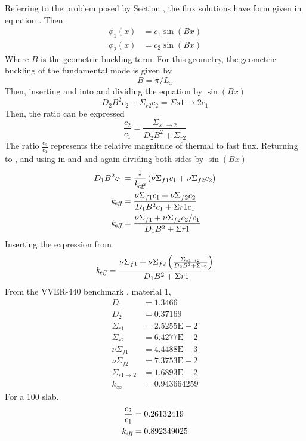   Referring to the problem posed by Section , the flux 
  solutions have form given in equation . Then
  \begin{align}
    \label{eq:twogroupflux1}
    \phi_1(x) &= c_1 \sin(Bx) \\
    \label{eq:twogroupflux2}
    \phi_2(x) &= c_2 \sin(Bx)
  \end{align}
  Where $B$ is the geometric buckling term. For this geometry, the geometric 
  buckling of the fundamental mode is given by 
  \begin{equation}
    B = \pi/L_x
  \end{equation}
  Then, inserting  and  into 
   and dividing the equation by $\sin(Bx)$
  \begin{equation}
    D_2 B^2 c_2 + \Sigma_{r2} c_2 = \Sigma{s1\rightarrow2} c_1
  \end{equation}
  Then, the ratio can be expressed
  \begin{equation} \label{eq:fluxratio}
    \frac{c_2}{c_1} = \frac{\Sigma_{s1\rightarrow2}}{D_2 B^2 + \Sigma_{r2}}
  \end{equation}
  The ratio $\frac{c_2}{c_1}$ represents the relative magnitude of thermal to 
  fast flux. Returning to , and using in 
   and  and again dividing both
  sides by  $\sin(Bx)$
  \begin{align}
    D_1 B^2 c_1 &= \frac{1}{k_{\!\mbox{\scriptsize \em eff}}} \left( \nu \Sigma_{f1} c_1 + 
      \nu \Sigma_{f2} c_2\right)\\
    k_{\!\mbox{\scriptsize \em eff}} &= \frac{\nu \Sigma_{f1} c_1 + \nu \Sigma_{f2} c_2}
      {D_1 B^2 c_1 + \Sigma{r1} c_1}\\
    k_{\!\mbox{\scriptsize \em eff}} &= \frac{\nu \Sigma_{f1} + \nu \Sigma_{f2} c_2/c_1}
      {D_1 B^2 + \Sigma{r1}}
  \end{align}
  Inserting the expression from 
  \begin{equation}
    k_{\!\mbox{\scriptsize \em eff}} = \frac{\nu \Sigma_{f1} + \nu \Sigma_{f2} 
      \left(\frac{\Sigma_{s1\rightarrow2}}{D_2B^2+\Sigma_{r2}}\right)}
      {D_1 B^2 + \Sigma{r1}}
  \end{equation}
  From the VVER-440 benchmark , material 1,
  \begin{align*}
    D_1 &= 1.3466  \\
    D_2 &= 0.37169 \\
    \Sigma_{r1} &= 2.5255\text{E}-2\\
    \Sigma_{r2} &= 6.4277\text{E}-2\\
    \nu \Sigma_{f1}  &= 4.4488\text{E}-3\\
    \nu \Sigma_{f2}  &= 7.3753\text{E}-2\\
    \Sigma_{s1\rightarrow2} &= 1.6893\text{E}-2 \\
    k_{\infty} &= 0.943664259
  \end{align*}
  For a 100  slab.
  \begin{align}
    \frac{c_2}{c_1} &= 0.26132419 \\
    k_{\!\mbox{\scriptsize \em eff}} &= 0.892349025
  \end{align}
  
